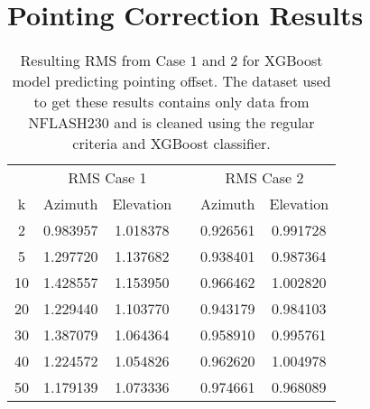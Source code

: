 \section{Pointing Correction Results}

\begin{table}[h]
    \centering %
    \caption{Resulting RMS from Case $1$ and $2$ for XGBoost model predicting pointing offset.
    The dataset used to get these results contains only data from NFLASH230 and is cleaned using the regular criteria and XGBoost classifier.}
    \begin{tabular}{ccc c cc}
        \toprule
        \multicolumn{1}{c}{} & \multicolumn{2}{c}{RMS Case 1} & & \multicolumn{2}{c}{RMS Case 2} \\
        \cmidrule(lr){2-3} \cmidrule(lr){5-6}
        k & Azimuth & Elevation & & Azimuth & Elevation \\
        \midrule
        2 &  0.983957 &  1.018378 & &  0.926561 &  0.991728 \\
        5 &  1.297720 &  1.137682 & &  0.938401 &  0.987364 \\
       10 &  1.428557 &  1.153950 & &  0.966462 &  1.002820 \\
       20 &  1.229440 &  1.103770 & &  0.943179 &  0.984103 \\
       30 &  1.387079 &  1.064364 & &  0.958910 &  0.995761 \\
       40 &  1.224572 &  1.054826 & &  0.962620 &  1.004978 \\
       50 &  1.179139 &  1.073336 & &  0.974661 &  0.968089 \\
        \bottomrule
    \end{tabular}
\end{table}


